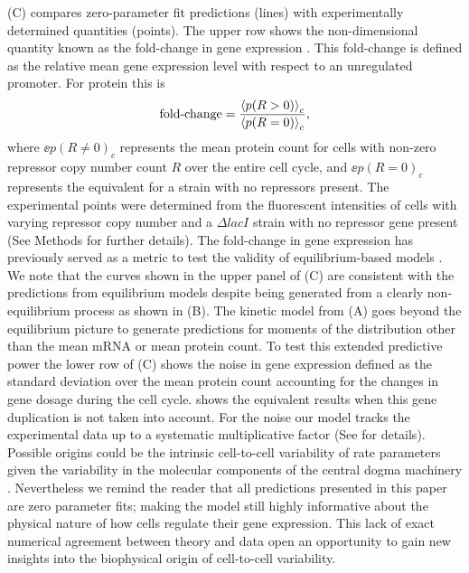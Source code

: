 (C) compares zero-parameter fit predictions (lines) with
experimentally determined quantities (points). The upper row shows the
non-dimensional quantity known as the fold-change in gene expression
\cite{Garcia2011c}. This fold-change is defined as the relative mean gene
expression level with respect to an unregulated promoter. For protein this is
\begin{equation}
	\text{fold-change} = {\left\langle p(R > 0) \right\rangle_c \over \left\langle p(R = 0) \right\rangle_c},
\end{equation}
where $\ee{p(R \neq 0)}_c$ represents the mean protein count for cells with
non-zero repressor copy number count $R$ over the entire cell cycle, and
$\ee{p(R = 0)}_c$ represents the equivalent for a strain with no repressors
present. The experimental points were determined from the fluorescent
intensities of cells with varying repressor copy number and a $\Delta lacI$
strain with no repressor gene present (See Methods for further details). The
fold-change in gene expression has previously served as a metric to test the
validity of equilibrium-based models \cite{Phillips2015}. We note that the
curves shown in the upper panel of (C) are consistent
with the predictions from equilibrium models \cite{Razo-Mejia2018} despite
being generated from a clearly non-equilibrium process as shown in
(B). The kinetic model from (A)
goes beyond the equilibrium picture to generate predictions for moments of the
distribution other than the mean mRNA or mean protein count. To test this
extended predictive power the lower row of (C) shows the
noise in gene expression defined as the standard deviation over the mean
protein count accounting for the changes in gene dosage during the cell cycle.
 shows the equivalent results when this gene duplication
is not taken into account. For the noise our model tracks the experimental data
up to a systematic multiplicative factor (See  for
details). Possible origins could be the intrinsic cell-to-cell variability of
rate parameters given the variability in the molecular components of the
central dogma machinery \cite{Jones2014a}. Nevertheless we remind the reader
that all predictions presented in this paper are zero parameter fits; making
the model still highly informative about the physical nature of how cells
regulate their gene expression. This lack of exact numerical agreement between
theory and data open an opportunity to gain new insights into the biophysical
origin of cell-to-cell variability. 

